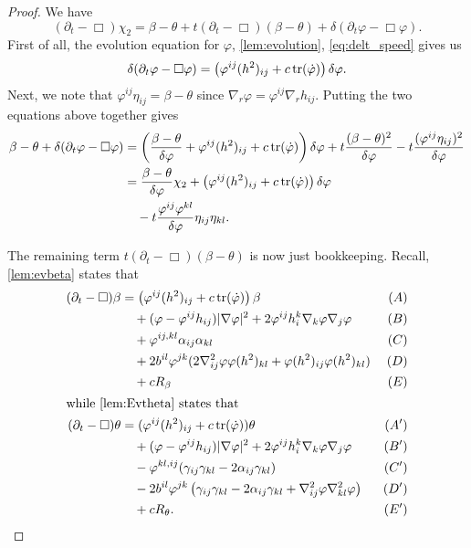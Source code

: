 \documentclass{amsart}
\begin{document}
\begin{proof}
We have
\[
(\partial_t - \Box)\chi_2 = \beta - \theta + t(\partial_{t} - \Box)(\beta - \theta) + \delta(\partial_t \varphi - \Box\varphi).
\]
First of all, the evolution equation for \(\varphi\), \cref{lem:evolution}, \cref{eq:delt_speed} gives us
\[
\delta(\partial_t \varphi - \Box\varphi) = \left(\varphi^{ij}(h^2)_{ij} + c\operatorname{tr}(\dot{\varphi})\right)\delta\varphi.
\]
Next, we note that
$
\varphi^{ij} \eta_{ij} = \beta - \theta
$
since \(\nabla_r \varphi = \varphi^{ij} \nabla_r h_{ij}\). Putting the two equations above together gives
\begin{equation}
\label{eq:deltchi1}
\begin{split}
\beta - \theta + \delta(\partial_t \varphi - \Box\varphi) &= \left(\frac{\beta-\theta}{\delta\varphi} + \varphi^{ij}(h^2)_{ij} + c\operatorname{tr}(\dot{\varphi})\right)\delta\varphi + t \frac{(\beta - \theta)^2}{\delta\varphi} - t \frac{(\varphi^{ij}\eta_{ij})^2}{\delta\varphi} \\
&= \frac{\beta-\theta}{\delta\varphi} \chi_2 + \left(\varphi^{ij}(h^2)_{ij} + c\operatorname{tr}(\dot{\varphi})\right)\delta\varphi \\
&\quad - t \frac{\varphi^{ij}\varphi^{kl}}{\delta\varphi} \eta_{ij}\eta_{kl}.
\end{split}
\end{equation}

The remaining term \(t(\partial_{t} - \Box)(\beta - \theta)\) is now just bookkeeping. Recall, \cref{lem:evbeta} states that
\begin{align*}
(\partial_{t} - \Box)\beta &= \left(\varphi^{ij}(h^2)_{ij} + c\operatorname{tr}(\dot{\p}) \right)\beta  & (A) \\
&\quad + (\varphi - \varphi^{ij}h_{ij}) |\nabla\varphi|^{2} + 2\varphi^{ij}h^{k}_{i}\nabla_k \varphi \nabla_j \varphi  & (B) \\
&\quad + \varphi^{ij,kl} \a_{ij} \a_{kl} & (C) \\
&\quad + 2b^{il}\varphi^{jk} (2\nabla^2_{ij}\varphi\varphi(h^2)_{kl} + \varphi(h^2)_{ij}\varphi(h^2)_{kl}) & (D) \\
&\quad + cR_{\beta}  & (E) \\
\intertext{while \cref{lem:Evtheta} states that}
(\partial_{t} - \Box)\theta &= (\varphi^{ij}(h^2)_{ij} + c\operatorname{tr}(\dot{\p}))\theta & (A') \\
&\quad + (\varphi - \varphi^{ij}h_{ij})|\nabla\varphi|^{2} + 2\varphi^{ij}h^{k}_{i}\nabla_k\varphi\nabla_j\varphi & (B') \\
&\quad - \varphi^{kl,ij} (\gamma_{ij}\gamma_{kl}  - 2\a_{ij} \gamma_{kl}) & (C') \\
&\quad - 2b^{il} \varphi^{jk} \left(\gamma_{ij} \gamma_{kl} - 2\a_{ij} \gamma_{kl} + \nabla^2_{ij}\varphi\nabla^2_{kl}\varphi\right) & (D') \\
&\quad + cR_{\theta}. & (E')
\end{align*}


\end{proof}
\end{document}
